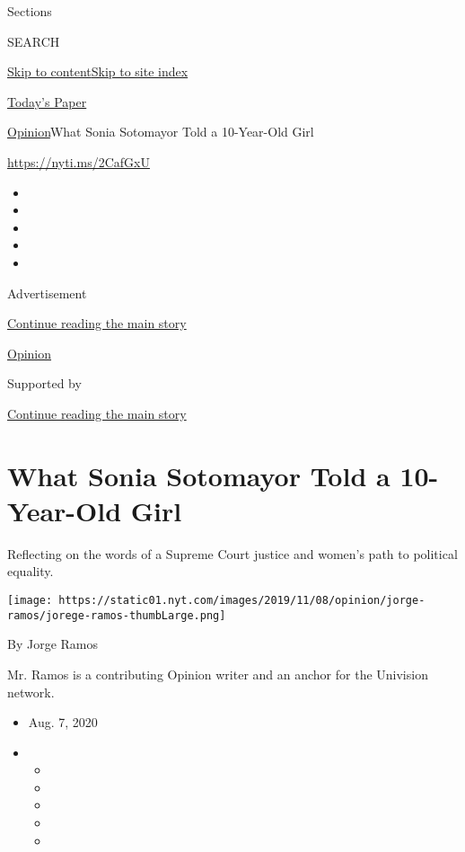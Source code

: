 Sections

SEARCH

\protect\hyperlink{site-content}{Skip to
content}\protect\hyperlink{site-index}{Skip to site index}

\href{https://myaccount.nytimes.com/auth/login?response_type=cookie\&client_id=vi}{}

\href{https://www.nytimes.com/section/todayspaper}{Today's Paper}

\href{/section/opinion}{Opinion}\textbar{}What Sonia Sotomayor Told a
10-Year-Old Girl

\href{https://nyti.ms/2CafGxU}{https://nyti.ms/2CafGxU}

\begin{itemize}
\item
\item
\item
\item
\item
\end{itemize}

Advertisement

\protect\hyperlink{after-top}{Continue reading the main story}

\href{/section/opinion}{Opinion}

Supported by

\protect\hyperlink{after-sponsor}{Continue reading the main story}

\hypertarget{what-sonia-sotomayor-told-a-10-year-old-girl}{%
\section{What Sonia Sotomayor Told a 10-Year-Old
Girl}\label{what-sonia-sotomayor-told-a-10-year-old-girl}}

Reflecting on the words of a Supreme Court justice and women's path to
political equality.

\texttt{[image: https://static01.nyt.com/images/2019/11/08/opinion/jorge-ramos/jorege-ramos-thumbLarge.png]}

By Jorge Ramos

Mr. Ramos is a contributing Opinion writer and an anchor for the
Univision network.

\begin{itemize}
\item
  Aug. 7, 2020
\item
  \begin{itemize}
  \item
  \item
  \item
  \item
  \item
  \end{itemize}
\end{itemize}

